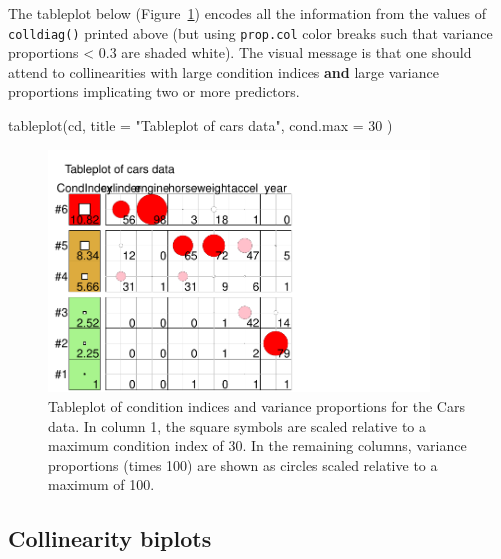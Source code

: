 \documentclass[
  letterpaper,
  10pt,
  krantz2]{krantz}
\makeatletter
\newenvironment{Shaded}{\begin{snugshade}}{\end{snugshade}}
\newcommand{\AttributeTok}[1]{\textcolor[rgb]{0.40,0.45,0.13}{#1}}
\newcommand{\DecValTok}[1]{\textcolor[rgb]{0.68,0.00,0.00}{#1}}
\newcommand{\FunctionTok}[1]{\textcolor[rgb]{0.28,0.35,0.67}{#1}}
\newcommand{\NormalTok}[1]{\textcolor[rgb]{0.00,0.23,0.31}{#1}}
\newcommand{\StringTok}[1]{\textcolor[rgb]{0.13,0.47,0.30}{#1}}
\newenvironment{kframe}{%
  \medskip{}
  \setlength{\fboxsep}{.8em}
  \def\at@end@of@kframe{}%
  \ifinner\ifhmode%
  \def\at@end@of@kframe{\end{minipage}}%
  \begin{minipage}{\columnwidth}%
  \fi\fi%
  \def\FrameCommand##1{\hskip\@totalleftmargin \hskip-\fboxsep
  \colorbox{shadecolor}{##1}\hskip-\fboxsep
      \hskip-\linewidth \hskip-\@totalleftmargin \hskip\columnwidth}%
  \MakeFramed {\advance\hsize-\width
    \@totalleftmargin\z@ \linewidth\hsize
    \@setminipage}}%
{\par\unskip\endMakeFramed%
  \at@end@of@kframe}
\renewenvironment{Shaded}{\begin{kframe}}{\end{kframe}}
\makeatother
\begin{document}
The tableplot below (Figure~\ref{fig-cars-tableplot}) encodes all the
information from the values of \texttt{colldiag()} printed above (but
using \texttt{prop.col} color breaks such that variance proportions
\textless{} 0.3 are shaded white). The visual message is that one should
attend to collinearities with large condition indices \textbf{and} large
variance proportions implicating two or more predictors.

\begin{Shaded}
\begin{Highlighting}[]
\FunctionTok{tableplot}\NormalTok{(cd, }\AttributeTok{title =} \StringTok{"Tableplot of cars data"}\NormalTok{, }\AttributeTok{cond.max =} \DecValTok{30}\NormalTok{ )}
\end{Highlighting}
\end{Shaded}

\begin{figure}[H]

{\centering \includegraphics[width=0.9\textwidth,height=\textheight]{figs/fig-cars-tableplot-1.pdf}

}

\caption{\label{fig-cars-tableplot}Tableplot of condition indices and
variance proportions for the Cars data. In column 1, the square symbols
are scaled relative to a maximum condition index of 30. In the remaining
columns, variance proportions (times 100) are shown as circles scaled
relative to a maximum of 100.}

\end{figure}

\hypertarget{collinearity-biplots}{%
\subsection{Collinearity biplots}\label{collinearity-biplots}}
\end{document}
